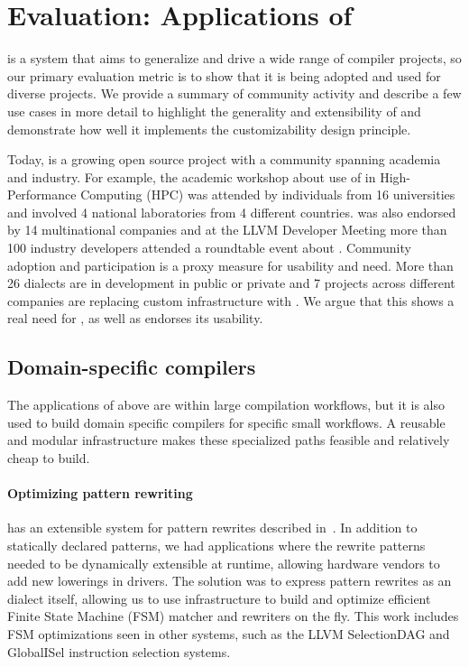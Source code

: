 \section{Evaluation: Applications of \MLIR}

\MLIR is a system that aims to generalize and drive a wide range of
compiler projects, so our primary evaluation metric is to show that it
is being adopted and used for diverse projects.  We provide a summary
of community activity and describe a few use cases in more detail to
highlight the generality and extensibility of \MLIR and demonstrate
how well it implements the customizability design principle.

Today, \MLIR is a growing open source project with a community
spanning academia and industry.  For example, the academic workshop
about use of \MLIR in High-Performance Computing (HPC) was attended by
individuals from 16 universities and involved 4 national laboratories
from 4 different countries.  \MLIR was also endorsed by 14
multinational companies and at the LLVM Developer Meeting more than
100 industry developers attended a roundtable event about \MLIR.
Community adoption and participation is a proxy measure for usability
and need.  More than 26 dialects are in development in public or
private and 7 projects across different companies are replacing custom
infrastructure with \MLIR.  We argue that this shows a real need for
\MLIR, as well as endorses its usability.





\subsection{Domain-specific compilers}

The applications of \MLIR above are within large compilation
workflows, but it is also used to build domain specific compilers for
specific small workflows.  A reusable and modular infrastructure makes
these specialized paths feasible and relatively cheap to build.

\paragraph{Optimizing \MLIR pattern rewriting}

\MLIR has an extensible system for pattern rewrites described in~.
In addition to statically declared patterns, we had
applications where the rewrite patterns needed to be dynamically
extensible at runtime, allowing hardware vendors to add new lowerings
in drivers.  The solution was to express \MLIR pattern rewrites as an
\MLIR dialect itself, allowing us to use \MLIR infrastructure to build
and optimize efficient Finite State Machine (FSM) matcher and
rewriters on the fly.  This work includes FSM optimizations seen in
other systems, such as the LLVM SelectionDAG and GlobalISel
instruction selection systems.


